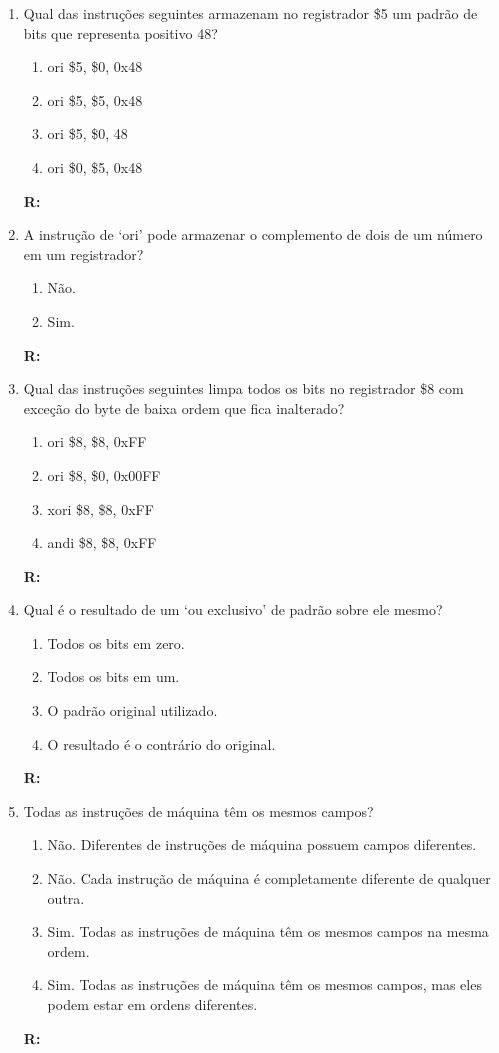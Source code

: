 \documentclass[a4paper,11pt]{article}
\begin{document}
\begin{enumerate}
    \item{Qual das instruções seguintes armazenam no registrador \$5 um padrão de bits que
            representa positivo 48?}
        \begin{enumerate}
            \item{ori \$5, \$0, 0x48}
            \item{ori \$5, \$5, 0x48}
            \item{ori \$5, \$0, 48}
            \item{ori \$0, \$5, 0x48}
        \end{enumerate}
        \textbf{R: }

    \item{A instrução de `ori' pode armazenar o complemento de dois de um número em um registrador?}
        \begin{enumerate}
            \item{Não.}
            \item{Sim.}
        \end{enumerate}
        \textbf{R:}

    \item{Qual das instruções seguintes limpa todos os bits no registrador \$8 com exceção do byte de
            baixa ordem que fica inalterado?}
        \begin{enumerate}
            \item{ori \$8, \$8, 0xFF}
            \item{ori \$8, \$0, 0x00FF}
            \item{xori \$8, \$8, 0xFF}
            \item{andi \$8, \$8, 0xFF}
        \end{enumerate}
        \textbf{R: }

    \item{Qual é o resultado de um `ou exclusivo' de padrão sobre ele mesmo?}
        \begin{enumerate}
            \item{Todos os bits em zero.}
            \item{Todos os bits em um.}
            \item{O padrão original utilizado.}
            \item{O resultado é o contrário do original.}
        \end{enumerate}
        \textbf{R:}

    \item{Todas as instruções de máquina têm os mesmos campos?}
        \begin{enumerate}
            \item{Não. Diferentes de instruções de máquina possuem campos diferentes.}
            \item{Não. Cada instrução de máquina é completamente diferente de qualquer outra.}
            \item{Sim. Todas as instruções de máquina têm os mesmos campos na mesma ordem.}
            \item{Sim. Todas as instruções de máquina têm os mesmos campos, mas eles podem estar em ordens
                    diferentes.}
        \end{enumerate}
        \textbf{R:}


\end{enumerate}
\end{document}
